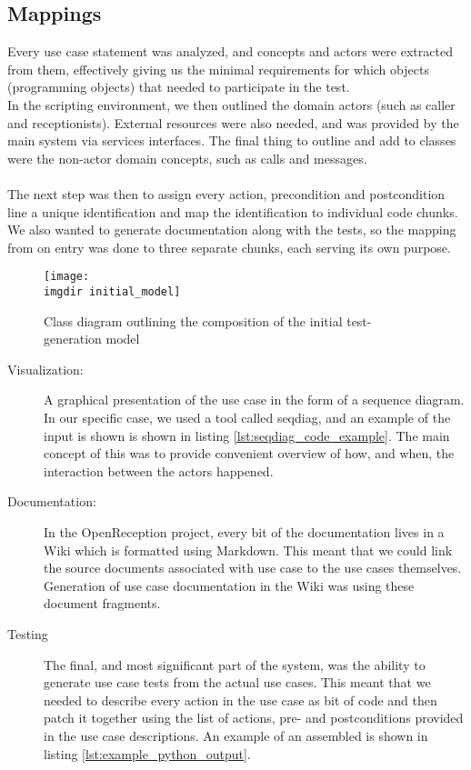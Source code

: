 \subsection{Mappings}
Every use case statement was analyzed, and concepts and actors were extracted from them, effectively giving us the minimal requirements for which objects (programming objects) that needed to participate in the test.\\
In the scripting environment, we then outlined the domain actors (such as caller and receptionists). External resources were also needed, and was provided by the main system via services interfaces. The final thing to outline and add to classes were the non-actor domain concepts, such as calls and messages.\\\\
The next step was then to assign every action, precondition and postcondition line a unique identification and map the identification to individual code chunks. We also wanted to generate documentation along with the tests, so the mapping from on entry was done to three separate chunks, each serving its own purpose.
\begin{figure}[!h]
\centering
\texttt{[image: \\imgdir initial\_model]}
\caption{Class diagram outlining the composition of the initial test-generation model}
\label{fig:first_generation_model}
\end{figure}
\begin{description}
  \item[Visualization:] A graphical presentation of the use case in the form of a sequence diagram. In our specific case, we used a tool called seqdiag, and an example of the input is shown is shown in listing \ref{lst:seqdiag_code_example}. The main concept of this was to provide convenient overview of how, and when, the interaction between the actors happened.
  \item[Documentation:] In the OpenReception project, every bit of the documentation lives in a Wiki which is formatted using Markdown. This meant that we could link the source documents associated with use case to the use cases themselves. Generation of use case documentation in the Wiki was using these document fragments.
  \item[Testing] The final, and most significant part of the system, was the ability to generate use case tests from the actual use cases. This meant that we needed to describe every action in the use case as bit of code and then patch it together using the list of actions, pre- and postconditions provided in the use case descriptions. An example of an assembled is shown in listing \ref{lst:example_python_output}.
\end{description}
